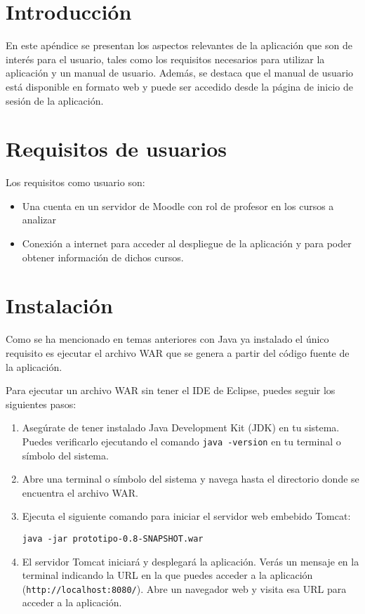 
\section{Introducción}
En este apéndice se presentan los aspectos relevantes de la aplicación que son de interés para el usuario, tales como los requisitos necesarios para utilizar la aplicación y un manual de usuario. Además, se destaca que el manual de usuario está disponible en formato web y puede ser accedido desde la página de inicio de sesión de la aplicación.
\section{Requisitos de usuarios}
Los requisitos como usuario son:
\begin{itemize}
	\item Una cuenta en un servidor de Moodle con rol de profesor en los cursos a analizar
	\item Conexión a internet para acceder al despliegue de la aplicación y para poder obtener información de dichos cursos.
\end{itemize}
\section{Instalación}
Como se ha mencionado en temas anteriores con Java ya instalado el único requisito es ejecutar el archivo WAR que se genera a partir del código fuente de la aplicación.

Para ejecutar un archivo WAR sin tener el IDE de Eclipse, puedes seguir los siguientes pasos:

\begin{enumerate}
  \item Asegúrate de tener instalado Java Development Kit (JDK) en tu sistema. Puedes verificarlo ejecutando el comando \texttt{java -version} en tu terminal o símbolo del sistema.
  \item Abre una terminal o símbolo del sistema y navega hasta el directorio donde se encuentra el archivo WAR.
  \item Ejecuta el siguiente comando para iniciar el servidor web embebido Tomcat:

  \texttt{java -jar prototipo-0.8-SNAPSHOT.war}
  
  \item El servidor Tomcat iniciará y desplegará la aplicación. Verás un mensaje en la terminal indicando la URL en la que puedes acceder a la aplicación (\texttt{http://localhost:8080/}). Abre un navegador web y visita esa URL para acceder a la aplicación.
\end{enumerate}

